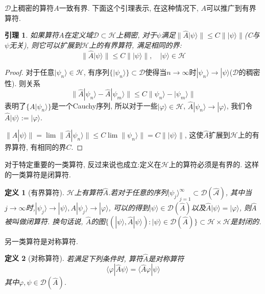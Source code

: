 \documentclass[a4paper,11pt]{article}
\newtheorem{definition}{\hspace{2em}定义}[section]
\newtheorem{lemma}{\hspace{2em}引理}[section]
\newtheorem{proof}{证明}[section]
\begin{document}
$\mathcal{D}$上稠密的算符$A$一致有界. 下面这个引理表示, 在这种情况下, $A$可以推广到有界算符.
\begin{lemma}
  如果算符$A$在定义域$\mathcal{D}\subset\mathcal{H}$上稠密, 对于$\psi$满足$\|\hat{A}|\psi\rangle\|\leq C\||\psi\rangle\|$(C与$\psi$无关), 则它可以扩展到$\mathcal{H}$上的有界算符, 满足相同的界:
\begin{equation*}
  \|\hat{A}|\psi\rangle\|\leq C\||\psi\rangle\|,\quad|\psi\rangle\in\mathcal{H}
\end{equation*}
\end{lemma}
\begin{proof}
  对于任意$|\psi_n\rangle\in\mathcal{H}$, 有序列$\{|\psi_n\rangle\}\subset \mathcal{D}$使得当$n\to\infty$时$|\psi_n\rangle\to|\psi\rangle$($\mathcal{D}$的稠密性). 则关系
\begin{equation*}
  \|\hat{A}|\psi_n\rangle-\hat{A}|\psi_m\rangle\|\leq C\|\psi_n\rangle-|\psi_m\rangle\|
\end{equation*}
表明了$\{A|\psi_n\rangle\}$是一个Cauchy序列, 所以对于一些$|\varphi\rangle\in\mathcal{H}$, $\hat{A}|\psi_n\rangle\to|\varphi\rangle$, 我们令$\hat{A}|\psi\rangle:=|\varphi\rangle$.

$\|\hat{A}|\psi\rangle\|=\lim\|\hat{A}|\psi_n\rangle\|\leq C\lim\|\psi_n\rangle\|=C\||\psi\rangle\|$, 这使$\hat{A}$扩展到$\mathcal{H}$上的有界算符, 有相同的界$C$.
\end{proof}
对于特定重要的一类算符, 反过来说也成立:定义在$\mathcal{H}$上的算符必须是有界的. 这样的一类算符是闭算符.
\begin{definition}[有界算符]\label{Closed operator def}
  $\mathcal{H}$上有算符$\hat{A}$.若对于任意的序列${|\psi_j\rangle}_{j=1}^{\infty}\subset\mathcal{D(\hat{A})}$, 其中当$j\to\infty$时,$|\psi_j\rangle\to|\psi\rangle, A|\psi_j\rangle\to|\varphi\rangle$, 可以的得到$|\psi\rangle\in\mathcal{D}(\hat{A})$以及$\hat{A}|\psi\rangle=|\varphi\rangle$, 则$\hat{A}$被叫做闭算符. 换句话说, $\hat{A}$的图$\{(|\psi\rangle,\hat{A}|\psi\rangle):|\psi\rangle\in\mathcal{D}(\hat{A})\}\subset\mathcal{H}\times\mathcal{H}$是封闭的.
\end{definition}
另一类算符是对称算符.
\begin{definition}[对称算符]\label{Symmetric operator}
  若满足下列条件时, 算符$\hat{A}$是对称算符
\begin{equation*}
  \langle\varphi|\hat{A}\psi\rangle=\langle\hat{A}\varphi|\psi\rangle
\end{equation*}
其中$\varphi,\psi\in\mathcal{D}(\hat{A})$.
\end{definition}
\end{document}

